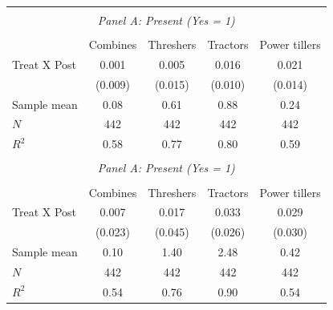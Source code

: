 \begin{tabular}{l*{4}{c}} \hline
\hline \\ \multicolumn{5}{c}{\textit{Panel A: Present (Yes = 1)}} \\\\ [-1ex] \hline           &\multicolumn{1}{c}{Combines} & \multicolumn{1}{c}{Threshers} &\multicolumn{1}{c}{Tractors}          &\multicolumn{1}{c}{Power tillers} \\ \hline
Treat X Post        &       0.001         &       0.005         &       0.016\sym{*}  &       0.021         \\
                    &     (0.009)         &     (0.015)         &     (0.010)         &     (0.014)         \\
\hline
Sample mean         &        0.08         &        0.61         &        0.88         &        0.24         \\
$N$                 &         442         &         442         &         442         &         442         \\
$R^2$               &        0.58         &        0.77         &        0.80         &        0.59         \\
\hline \\ \multicolumn{5}{c}{\textit{Panel A: Present (Yes = 1)}} \\\\ [-1ex] \hline           &\multicolumn{1}{c}{Combines} & \multicolumn{1}{c}{Threshers} &\multicolumn{1}{c}{Tractors}          &\multicolumn{1}{c}{Power tillers} \\ \hline
Treat X Post        &       0.007         &       0.017         &       0.033         &       0.029         \\
                    &     (0.023)         &     (0.045)         &     (0.026)         &     (0.030)         \\
\hline
Sample mean         &        0.10         &        1.40         &        2.48         &        0.42         \\
$N$                 &         442         &         442         &         442         &         442         \\
$R^2$               &        0.54         &        0.76         &        0.90         &        0.54         \\
\hline\hline \end{tabular}
